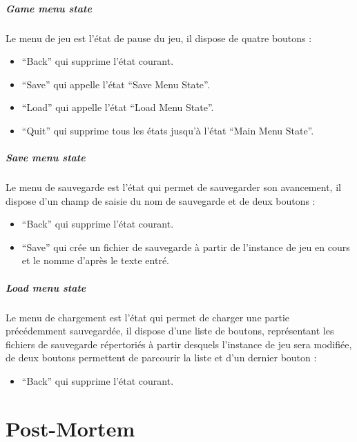 \documentclass[a4paper]{article}
\newcommand{\alinea}{\hspace*{0.5cm}}
\begin{document}
			\subsubsection{Game menu state}
				\alinea Le menu de jeu est l’état de pause du jeu, il dispose de quatre boutons :
	 		        \begin{itemize}[label=-] 
			             \item “Back” qui supprime l’état courant.
			             \item “Save” qui appelle l’état “Save Menu State”.
				  \item “Load” qui appelle l’état “Load Menu State”.
				  \item “Quit” qui supprime tous les états jusqu’à l’état “Main Menu State”.
			        \end{itemize}
			\subsubsection{Save menu state}
				\alinea Le menu de sauvegarde est l’état qui permet de sauvegarder son avancement, il dispose d’un champ de saisie du nom de sauvegarde et de deux boutons :
	 		        \begin{itemize}[label=-] 
			             \item “Back” qui supprime l’état courant.
			             \item “Save” qui crée un fichier de sauvegarde à partir de l’instance de jeu en cours et le nomme d’après le texte entré.
			        \end{itemize}
			\subsubsection{Load menu state}
				\alinea Le menu de chargement est l’état qui permet de charger une partie précédemment sauvegardée, il dispose d’une liste de boutons, représentant les fichiers de sauvegarde répertoriés à partir desquels l’instance de jeu sera modifiée, de deux boutons permettent de parcourir la liste et d’un dernier bouton :
	 		        \begin{itemize}[label=-] 
			             \item “Back” qui supprime l’état courant.
			        \end{itemize}
			
	

  \newpage
  \part{Post-Mortem}
  
\end{document}
